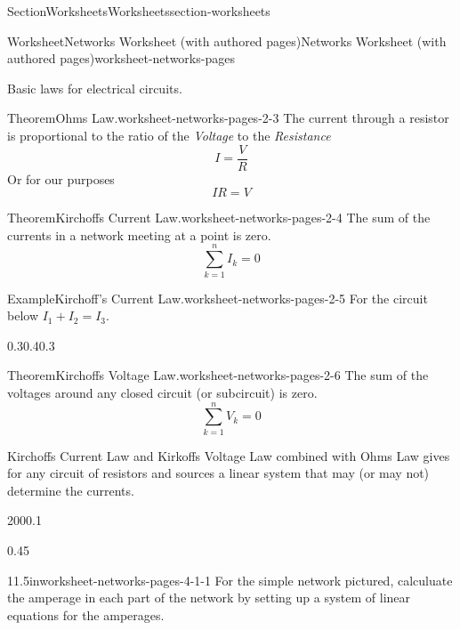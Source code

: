 \documentclass[twoside,10pt,]{article}
\numberwithin{equation}{section}
\begin{document}
\begin{sectionptx}{Section}{Worksheets}{}{Worksheets}{}{}{section-worksheets}
\begin{worksheet-subsection}{Worksheet}{Networks Worksheet (with authored pages)}{}{Networks Worksheet (with authored pages)}{}{}{worksheet-networks-pages}
\begin{introduction}{Basic laws for electrical circuits.}
\begin{theorem}{Theorem}{Ohms Law.}{}{worksheet-networks-pages-2-3}%
The current through a resistor is proportional to the ratio of the \emph{Voltage} to the \emph{Resistance}%
\begin{equation*}
I = \frac{V}{R} 
\end{equation*}
Or for our purposes%
\begin{equation*}
I R = V 
\end{equation*}
%
\end{theorem}
\begin{theorem}{Theorem}{Kirchoffs Current Law.}{}{worksheet-networks-pages-2-4}%
The sum of the currents in a network meeting at a point is zero.%
\begin{equation*}
\sum_{k=1}^n I_k = 0 
\end{equation*}
%
\end{theorem}
\begin{example}{Example}{Kirchoff's Current Law.}{worksheet-networks-pages-2-5}%
For the circuit below \(I_1 + I_2 = I_3 \).%
\begin{image}{0.3}{0.4}{0.3}{}%
%
\end{image}%
\end{example}
\begin{theorem}{Theorem}{Kirchoffs Voltage Law.}{}{worksheet-networks-pages-2-6}%
The sum of the voltages around any closed circuit (or subcircuit) is zero.%
\begin{equation*}
\sum_{k=1}^n V_k = 0 
\end{equation*}
%
\end{theorem}
Kirchoffs Current Law and Kirkoffs Voltage Law combined with Ohms Law gives for any circuit of resistors and sources a linear system that may (or may not) determine the currents.%
\end{introduction}%
\clearpage
\begin{sidebyside}{2}{0}{0}{0.1}%
\begin{sbspanel}{0.45}%
\begin{divisionexercise}{1}{}{1.5in}{worksheet-networks-pages-4-1-1}%
For the simple network pictured, calculuate the amperage in each part of the network by setting up a system of linear equations for the amperages.%
\noindent\resizebox{\linewidth}{!}{%
}
\end{divisionexercise}
\end{sbspanel}
\end{sidebyside}
\end{worksheet-subsection}
\end{sectionptx}
\end{document}
